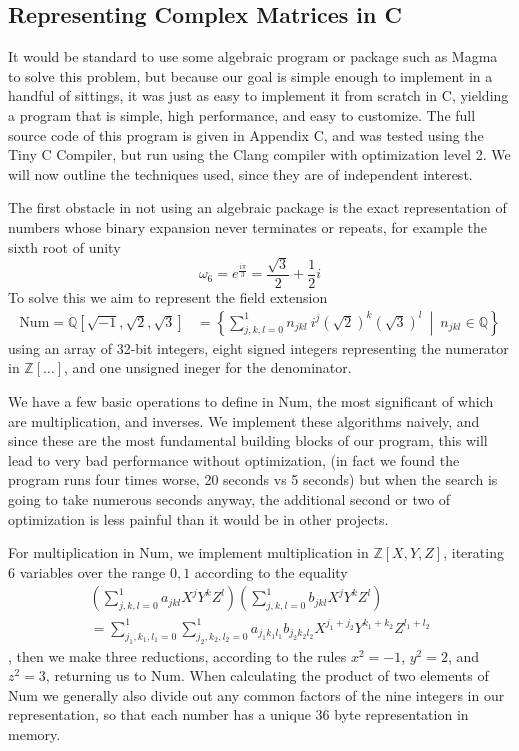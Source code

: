 \subsection{Representing Complex Matrices in C}
It would be standard to use some algebraic program or package such as Magma to solve this problem, but because our goal is simple enough to implement in a handful of sittings, it was just as easy to implement it from scratch in C, yielding a program that is simple, high performance, and easy to customize. The full source code of this program is given in Appendix C, and was tested using the Tiny C Compiler, but run using the Clang compiler with optimization level 2. We will now outline the techniques used, since they are of independent interest. 

The first obstacle in not using an algebraic package is the exact representation of numbers whose binary expansion never terminates or repeats, for example the sixth root of unity
\[\omega_6 = e^{\frac{i\pi}{3}} = \frac{\sqrt{3}}{2} + \frac{1}{2}i\]
To solve this we aim to represent the field extension
\begin{align*}
	\text{Num} = \mathbb{Q}[\sqrt{-1}, \sqrt{2}, \sqrt{3}]
	&= \left\{ \sum_{j,k,l = 0}^1 n_{jkl}\ i^j\left(\sqrt{2}\right)^k\left(\sqrt{3}\right)^l
	\ \middle|\ n_{jkl} \in \mathbb{Q}\right\}
\end{align*}
using an array of 32-bit integers, eight signed integers representing the numerator in $\mathbb{Z}[\dots]$, and one unsigned ineger for the denominator.

We have a few basic operations to define in Num, the most significant of which are multiplication, and inverses. We implement these algorithms naively, and since these are the most fundamental building blocks of our program, this will lead to very bad performance without optimization, (in fact we found the program runs four times worse, 20 seconds vs 5 seconds) but when the search is going to take numerous seconds anyway, the additional second or two of optimization is less painful than it would be in other projects.

For multiplication in Num, we implement multiplication in $\mathbb{Z}[X, Y, Z]$, iterating 6 variables over the range ${0, 1}$ according to the equality
\begin{align*}
	\left(\sum_{j,k,l = 0}^1 a_{jkl}X^jY^kZ^l\right)\left(\sum_{j,k,l = 0}^1 b_{jkl}X^jY^kZ^l\right)
	\\= \sum_{j_1,k_1,l_1=0}^1\sum_{j_2,k_2,l_2=0}^1 a_{j_1k_1l_1}b_{j_2k_2l_2}X^{j_1+j_2}Y^{k_1+k_2}Z^{l_1+l_2}
\end{align*}
, then we make three reductions, according to the rules $x^2 = -1$, $y^2 = 2$, and $z^2 = 3$, returning us to Num. When calculating the product of two elements of Num we generally also divide out any common factors of the nine integers in our representation, so that each number has a unique 36 byte representation in memory.

